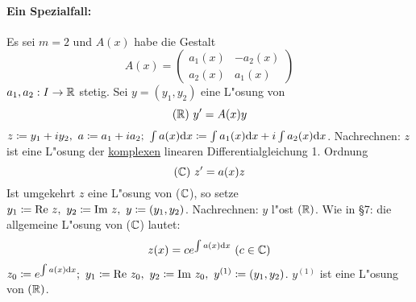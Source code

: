 \documentclass[a4paper,twoside,DIV15,BCOR12mm]{scrbook}
\begin{document}
\paragraph{Ein Spezialfall:}Es sei $m=2$ und $A(x)$ habe die Gestalt 
\[
	A(x)=\begin{pmatrix}
		a_1(x) & -a_2(x) \\
		a_2(x) & a_1(x)
	\end{pmatrix}
\]
$a_1, a_2:I\to\mathbb{R}$ stetig. Sei $y=(y_1, y_2)$ eine L"osung von
\[
	(\mathbb{R})\ y'=A(x)y
\]
$z\da y_1+iy_2,\ a\da a_1+ia_2;\ \int a(x)\text{d}x\da \int a_1(x)\text{d}x + i\int a_2(x)\text{d}x$.
Nachrechnen: $z$ ist eine L"osung der \underline{komplexen} linearen Differentialgleichung 1. Ordnung
\[
	(\mathbb{C})\ z'=a(x)z
\]
Ist umgekehrt $z$ eine L"osung von ($\mathbb{C}$), so setze $y_1\da \text{Re }z,\ y_2\da \text{Im }z,\ y\da (y_1, y_2)$. Nachrechnen: $y$ l"ost $(\mathbb{R})$.
Wie in §7: die allgemeine L"osung von ($\mathbb{C}$) lautet:
\[
	z(x)=ce^{\int a(x)\text{d}x}\ (c\in\MdC)
\]
$z_0\da e^{\int a(x)\text{d}x};\ y_1\da \text{Re }z_0,\ y_2\da \text{Im }z_0,\ y^{(1)}\da (y_1, y_2)$. $y^{(1)}$ ist eine L"osung von $(\mathbb{R})$.
\end{document}
